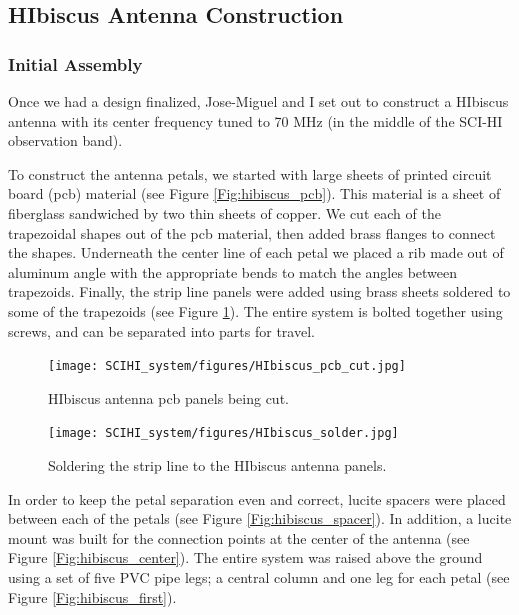 \subsection{HIbiscus Antenna Construction}

\subsubsection{Initial Assembly}
Once we had a design finalized, Jose-Miguel and I set out to construct a HIbiscus antenna with its center frequency tuned to 70 MHz (in the middle of the SCI-HI observation band).

To construct the antenna petals, we started with large sheets of printed circuit board (pcb) material (see Figure \ref{Fig:hibiscus_pcb}). This material is a sheet of fiberglass sandwiched by two thin sheets of copper. We cut each of the trapezoidal shapes out of the pcb material, then added brass flanges to connect the shapes. Underneath the center line of each petal we placed a rib made out of aluminum angle with the appropriate bends to match the angles between trapezoids. Finally, the strip line panels were added using brass sheets soldered to some of the trapezoids (see Figure \ref{Fig:hibiscus_solder}). The entire system is bolted together using screws, and can be separated into parts for travel. 

\begin{figure}[htb]
\centering
\begin{minipage}[b]{0.39\textwidth}
\centering
\texttt{[image: SCIHI\_system/figures/HIbiscus\_pcb\_cut.jpg]}
\caption{HIbiscus antenna pcb panels being cut. }
\label{Fig:hibiscus_pcb}
\end{minipage}%
\begin{minipage}[b]{0.02\textwidth}
\hspace{1cm}
\end{minipage}%
\begin{minipage}[b]{0.55\textwidth}
\centering
\texttt{[image: SCIHI\_system/figures/HIbiscus\_solder.jpg]}
\caption{Soldering the strip line to the HIbiscus antenna panels.}
\label{Fig:hibiscus_solder}
\end{minipage}
\end{figure} 

In order to keep the petal separation even and correct, lucite spacers were placed between each of the petals (see Figure \ref{Fig:hibiscus_spacer}). In addition, a lucite mount was built for the connection points at the center of the antenna (see Figure \ref{Fig:hibiscus_center}). The entire system was raised above the ground using a set of five PVC pipe legs; a central column and one leg for each petal (see Figure \ref{Fig:hibiscus_first}). 

